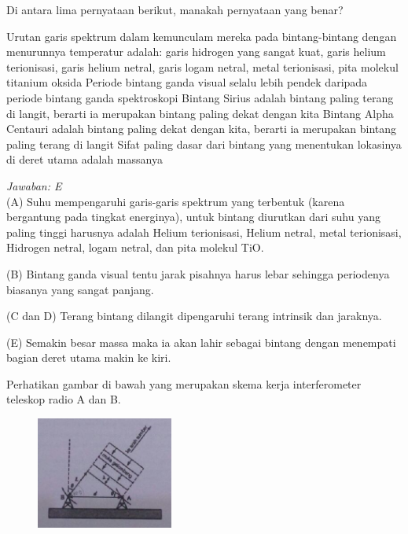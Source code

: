 \documentclass[11pt,fleqn, a4paper]{exam}
\begin{document}
\begin{questions}
\vspace{0.5cm}
\question Di antara lima pernyataan berikut, manakah pernyataan yang benar?  
\begin{choices}
\choice Urutan garis spektrum dalam kemunculam mereka pada bintang-bintang dengan menurunnya temperatur adalah: garis hidrogen yang sangat kuat, garis helium terionisasi, garis helium netral, garis logam netral, metal terionisasi, pita molekul titanium oksida
\choice Periode bintang ganda visual selalu lebih pendek daripada periode bintang ganda spektroskopi
\choice Bintang Sirius adalah bintang paling terang di langit, berarti ia merupakan bintang paling dekat dengan kita
\choice Bintang Alpha Centauri adalah bintang paling dekat dengan kita, berarti ia merupakan bintang paling terang di langit
\choice Sifat paling dasar dari bintang yang menentukan lokasinya di deret utama adalah massanya 
\end{choices}

\textit{Jawaban: E}\\
(A) Suhu mempengaruhi garis-garis spektrum yang terbentuk (karena bergantung pada tingkat energinya), untuk bintang diurutkan dari suhu yang paling tinggi harusnya adalah Helium terionisasi, Helium netral, metal terionisasi, Hidrogen netral, logam netral, dan pita molekul TiO. 

(B) Bintang ganda visual tentu jarak pisahnya harus lebar sehingga periodenya biasanya yang sangat panjang.

(C dan D) Terang bintang dilangit dipengaruhi terang intrinsik dan jaraknya.

(E) Semakin besar massa maka ia akan lahir sebagai bintang dengan menempati bagian deret utama makin ke kiri.



\vspace{0.5cm}
\question Perhatikan gambar di bawah yang merupakan skema kerja interferometer teleskop radio A dan B.

\begin{figure}[H]
\centering
\includegraphics[width=0.4\textwidth]{gambar/6.png}
\end{figure}


\end{questions}
\end{document}
